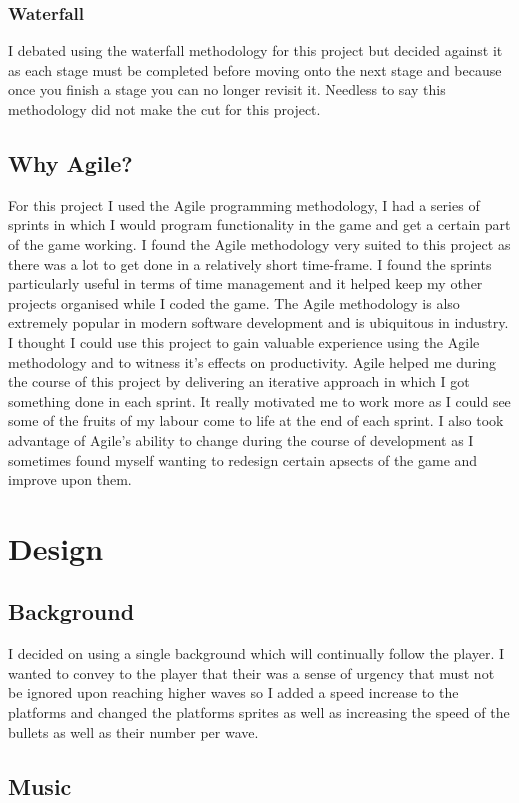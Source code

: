 \documentclass{report}
\begin{document}
\subsection{Waterfall}
I debated using the waterfall methodology for this project but decided against it as each stage must be completed before moving onto the next stage and because once you finish a stage you can no longer revisit it.  Needless to say this methodology did not make the cut for this project.
\section{Why Agile?}
For this project I used the Agile\cite{Agile} programming methodology, I had a series of sprints\cite{Sprint} in which I would program functionality in the game and get a certain part of the game working. I found the Agile methodology very suited to this project as there was a lot to get done in a relatively short time-frame.  I found the sprints particularly useful in terms of time management and it helped keep my other projects organised while I coded the game.  The Agile methodology is also extremely popular in modern software development and is ubiquitous in industry.  I thought I could use this project to gain valuable experience using the Agile methodology and to witness it's effects on productivity.  Agile helped me during the course of this project by delivering an iterative approach in which I got something done in each sprint.  It really motivated me to work more as I could see some of the fruits of my labour come to life at the end of each sprint.  I also took advantage of Agile's ability to change during the course of development as I sometimes found myself wanting to redesign certain apsects of the game and improve upon them.
\chapter{Design}
\section{Background}
I decided on using a single background which will continually follow the player.  I wanted to convey to the player that their was a sense of urgency that must not be ignored upon reaching higher waves so I added a speed increase to the platforms and changed the platforms sprites as well as increasing the speed of the bullets as well as their number per wave.
\section{Music}
\end{document}
